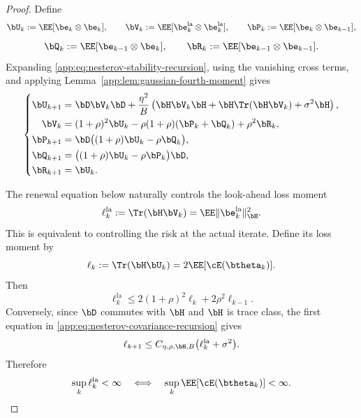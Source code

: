 \documentclass[11pt]{article}
\newcommand{\la}{\mathrm{la}}
\begin{document}
\begin{proof}
Define
\[
\bU_k:=\EE[\be_k\otimes\be_k],
\qquad
\bV_k:=\EE[\be_k^{\la}\otimes\be_k^{\la}],
\qquad
\bP_k:=\EE[\be_k\otimes\be_{k-1}],
\]
\[
\bQ_k:=\EE[\be_{k-1}\otimes\be_k],
\qquad
\bR_k:=\EE[\be_{k-1}\otimes\be_{k-1}].
\]
Expanding \eqref{app:eq:nesterov-stability-recursion}, using the vanishing cross terms, and
applying Lemma~\ref{app:lem:gaussian-fourth-moment} gives
\begin{equation}
\label{app:eq:nesterov-covariance-recursion}
\left\{
\begin{aligned}
\bU_{k+1}
={}&
\bD\bV_k\bD
+
\frac{\eta^2}{B}
\left(
\bH\bV_k\bH
+
\bH\Tr(\bH\bV_k)
+
\sigma^2\bH
\right),
\\
\bV_k
={}&
(1+\rho)^2\bU_k
-
\rho(1+\rho)(\bP_k+\bQ_k)
+
\rho^2\bR_k,
\\
\bP_{k+1}
={}&
\bD\bigl((1+\rho)\bU_k-\rho\bQ_k\bigr),
\\
\bQ_{k+1}
={}&
\bigl((1+\rho)\bU_k-\rho\bP_k\bigr)\bD,
\\
\bR_{k+1}
={}&
\bU_k.
\end{aligned}
\right.
\end{equation}

The renewal equation below naturally controls the look-ahead loss moment
\[
\ell_k^{\la}
:=
\Tr(\bH\bV_k)
=
\EE\|\be_k^{\la}\|_{\bH}^2.
\]
This is equivalent to controlling the risk at the actual iterate. Define its loss moment by
\[
\ell_k
:=
\Tr(\bH\bU_k)
=
2\EE[\cE(\btheta_k)].
\]
Then
\begin{equation}
\label{app:eq:nesterov-risk-equivalence-forward}
\ell_k^{\la}
\leq
2(1+\rho)^2\ell_k+2\rho^2\ell_{k-1}.
\end{equation}
Conversely, since \(\bD\) commutes with \(\bH\) and \(\bH\) is trace class,
the first equation in \eqref{app:eq:nesterov-covariance-recursion} gives
\begin{equation}
\label{app:eq:nesterov-risk-equivalence-backward}
\ell_{k+1}
\leq
C_{\eta,\rho,\bH,B}
\bigl(\ell_k^{\la}+\sigma^2\bigr).
\end{equation}
Therefore
\[
\sup_k\ell_k^{\la}<\infty
\quad\Longleftrightarrow\quad
\sup_k\EE[\cE(\btheta_k)]<\infty.
\]


\end{proof}
\end{document}
